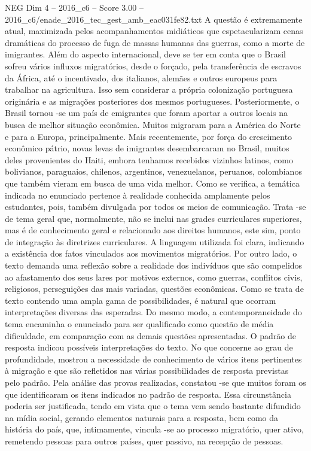 \begin{textsample}{NEG Dim 4 – 2016\_c6 – Score 3.00 – 2016\_c6/enade\_2016\_tec\_gest\_amb\_eac031fe82.txt}
A questão é extremamente atual, maximizada pelos acompanhamentos midiáticos que espetacularizam cenas dramáticas do processo de fuga de massas humanas das guerras, como a morte de imigrantes.
Além do aspecto internacional, deve se ter em conta que o Brasil sofreu vários influxos migratórios, desde o forçado, pela transferência de escravos da África, até o incentivado, dos italianos, alemães e outros europeus para trabalhar na agricultura.
Isso sem considerar a própria colonização portuguesa originária e as migrações posteriores dos mesmos portugueses.
Posteriormente, o Brasil tornou -se um país de emigrantes que foram aportar a outros locais na busca de melhor situação econômica.
Muitos migraram para a América do Norte e para a Europa, principalmente.
Mais recentemente, por força do crescimento econômico pátrio, novas levas de imigrantes desembarcaram no Brasil, muitos deles provenientes do Haiti, embora tenhamos recebidos vizinhos latinos, como bolivianos, paraguaios, chilenos, argentinos, venezuelanos, peruanos, colombianos que também vieram em busca de uma vida melhor.
Como se verifica, a temática indicada no enunciado pertence à realidade conhecida amplamente pelos estudantes, pois, também divulgada por todos os meios de comunicação.
Trata -se de tema geral que, normalmente, não se inclui nas grades curriculares superiores, mas é de conhecimento geral e relacionado aos direitos humanos, este sim, ponto de integração às diretrizes curriculares.
A linguagem utilizada foi clara, indicando a existência dos fatos vinculados aos movimentos migratórios.
Por outro lado, o texto demanda uma reflexão sobre a realidade dos indivíduos que são compelidos ao afastamento dos seus lares por motivos externos, como guerras, conflitos civis, religiosos, perseguições das mais variadas, questões econômicas.
Como se trata de texto contendo uma ampla gama de possibilidades, é natural que ocorram interpretações diversas das esperadas.
Do mesmo modo, a contemporaneidade do tema encaminha o enunciado para ser qualificado como questão de média dificuldade, em comparação com as demais questões apresentadas.
O padrão de resposta indicou possíveis interpretações do texto.
No que concerne ao grau de profundidade, mostrou a necessidade de conhecimento de vários itens pertinentes à migração e que são refletidos nas várias possibilidades de resposta previstas pelo padrão.
Pela análise das provas realizadas, constatou -se que muitos foram os que identificaram os itens indicados no padrão de resposta.
Essa circunstância poderia ser justificada, tendo em vista que o tema vem sendo bastante difundido na mídia social, gerando elementos naturais para a resposta, bem como da história do país, que, intimamente, vincula -se ao processo migratório, quer ativo, remetendo pessoas para outros países, quer passivo, na recepção de pessoas.

\end{textsample}
